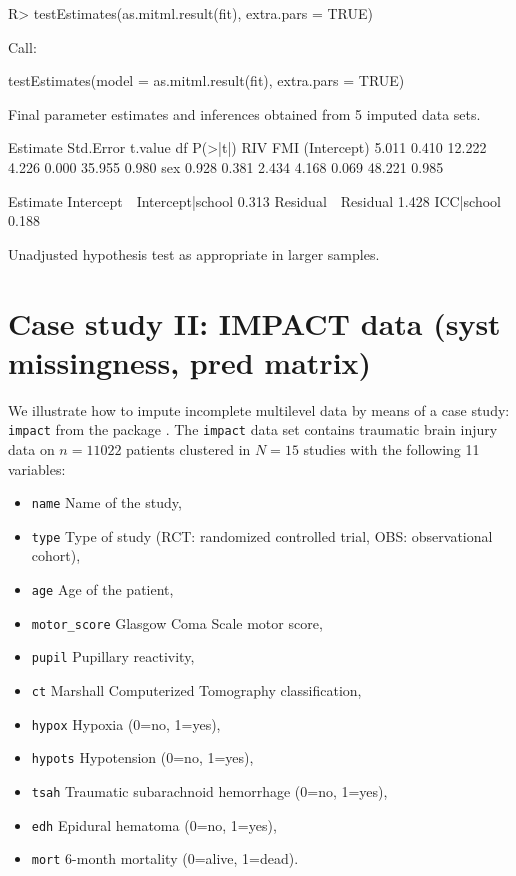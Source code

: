 \documentclass[
]{jss}
\providecommand{\tightlist}{%
  \setlength{\itemsep}{0pt}\setlength{\parskip}{0pt}}
\begin{document}
\begin{CodeChunk}
\begin{CodeInput}
R> testEstimates(as.mitml.result(fit), extra.pars = TRUE)
\end{CodeInput}
\begin{CodeOutput}

Call:

testEstimates(model = as.mitml.result(fit), extra.pars = TRUE)

Final parameter estimates and inferences obtained from 5 imputed data sets.

             Estimate Std.Error   t.value        df   P(>|t|)       RIV       FMI 
(Intercept)     5.011     0.410    12.222     4.226     0.000    35.955     0.980 
sex             0.928     0.381     2.434     4.168     0.069    48.221     0.985 

                            Estimate 
Intercept~~Intercept|school    0.313 
Residual~~Residual             1.428 
ICC|school                     0.188 

Unadjusted hypothesis test as appropriate in larger samples.
\end{CodeOutput}
\end{CodeChunk}

\hypertarget{case-study-ii-impact-data-syst-missingness-pred-matrix}{%
\section{Case study II: IMPACT data (syst missingness, pred
matrix)}\label{case-study-ii-impact-data-syst-missingness-pred-matrix}}

We illustrate how to impute incomplete multilevel data by means of a
case study: \texttt{impact} from the  package
\citep[empirical data on traumatic brain injuries, \(n = 11,022\) units
across \(N = 15\) clusters,][]{metamisc}. The \texttt{impact} data set
contains traumatic brain injury data on \(n = 11022\) patients clustered
in \(N = 15\) studies with the following 11 variables:

\begin{itemize}
\tightlist
\item
  \texttt{name} Name of the study,
\item
  \texttt{type} Type of study (RCT: randomized controlled trial, OBS:
  observational cohort),
\item
  \texttt{age} Age of the patient,
\item
  \texttt{motor\_score} Glasgow Coma Scale motor score,
\item
  \texttt{pupil} Pupillary reactivity,
\item
  \texttt{ct} Marshall Computerized Tomography classification,
\item
  \texttt{hypox} Hypoxia (0=no, 1=yes),
\item
  \texttt{hypots} Hypotension (0=no, 1=yes),
\item
  \texttt{tsah} Traumatic subarachnoid hemorrhage (0=no, 1=yes),
\item
  \texttt{edh} Epidural hematoma (0=no, 1=yes),
\item
  \texttt{mort} 6-month mortality (0=alive, 1=dead).
\end{itemize}
\end{document}

